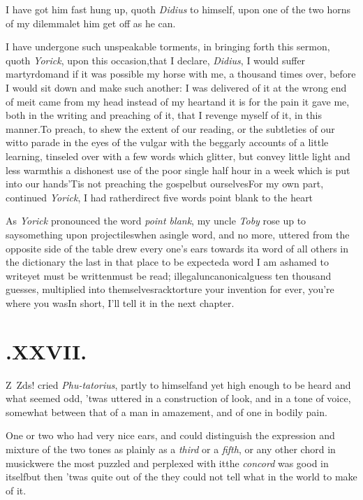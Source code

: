 \documentclass{article}
\begin{document}
\tsk I have got him fast hung up, quoth \textit{Didius}
to himself, upon one of the two horns of my
dilemma\tsh let him get off as he can.

I have undergone such unspeakable torments, in bringing
forth this sermon, quoth \textit{Yorick}, upon this
occasion,\tsk that I declare, \textit{Didius}, I would suffer
martyrdom\tsk and if it was possible my horse with me, a
thousand times over, before I would sit down and make such
another: I was delivered of it at the wrong end of me\tsk it
came from my head instead of my heart\tsk and it is for the
pain it gave me, both in the writing and preaching of it,
that I revenge myself of it, in this manner.\tsk To preach,
to shew the extent of our reading, or the subtleties of our
wit\tsk to parade in the eyes of the vulgar with the
beggarly accounts of a little learning, tinseled over with a
few words which glitter, but convey little light and less
warmth\tsk is a dishonest use of the poor single half hour
in a week which is put into our hands\tsk ’Tis not
preaching
the gospel\tsk but ourselves\tsk For my own part, continued
\textit{Yorick}, I had rather\break direct five words point blank
to the\break 
heart\tsk

As \textit{Yorick} pronounced the word \textit{point blank},
my uncle \textit{Toby} rose up to say\break something upon
projectiles\tsh when a\break single word, and no more, uttered
from the opposite side of the table drew every one’s ears
towards it\tsk a word of all others in the dictionary the
last in that place to be expected\tsk a word I am ashamed to
write\tsk yet must be written\tsk must be read;\tsk
illegal\tsk uncanonical\tsk guess ten thousand guesses,
multiplied into themselves\tsk rack\tsk torture your
invention for ever, you’re where you was\tsk\break In short,
I’ll tell it in the next chapter.

\null\smallskip
\section{.\enspace XXVII.}

\lettrine{Z}{\,}\tsh\tsh\break
\tsh\tsh\tsh\tsh\tsk\break
\tsh\tsh\tsk Z\tsh ds!  cried \textit{Phu-\break tatorius},
partly to himself\tsk and yet high enough to be heard\tsk
and what seemed odd, ’twas uttered in a construction of
look, and in a tone of voice, somewhat between that of a man
in amazement,\break
and of one in bodily pain.

One or two who had very nice ears, and could distinguish the
expression and mixture of the two tones as plainly as a
\textit{third} or a \textit{fifth}, or any other chord in musick\tsk were the most puzzled and perplexed
with it\tsk the \textit{concord} was good in itself\tsk but then
’twas quite out of the
they could not tell what in the world to make of it.
\end{document}
